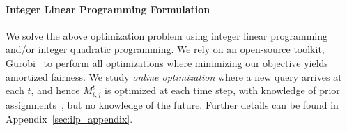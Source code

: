 \paragraph{Integer Linear Programming Formulation}
We solve the above optimization problem using integer linear programming and/or integer quadratic programming. We rely on an open-source toolkit, Gurobi~\cite{achterberg2019s} to perform all optimizations where minimizing our objective yields amortized fairness. We study \emph{online optimization} where a new query arrives at each $t$, and hence $M_{i,j}^t$ is optimized at each time step, with knowledge of prior assignments~\cite{biega2018equity}, but no knowledge of the future. Further details can be found in Appendix~\ref{sec:ilp_appendix}. 

\begin{table}
\centering
\caption{Summary statistics of all datasets. The relevance score in the \texttt{rateMDs} dataset and the query utility score in the \texttt{FairTREC2021} dataset are generated using pre-trained LLMs.}
\label{tab:ds_summary}
\footnotesize{
\begin{minipage}{\linewidth}
\end{minipage}
}
\end{table}
